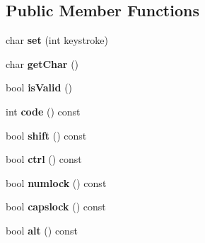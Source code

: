 \subsection*{Public Member Functions}
\begin{DoxyCompactItemize}
\item 
\hypertarget{classskl_1_1_key_input_a433d183979067662820d7b929e249b95}{}\label{classskl_1_1_key_input_a433d183979067662820d7b929e249b95} 
char {\bfseries set} (int keystroke)
\item 
\hypertarget{classskl_1_1_key_input_a9590de3ef1f3b34e1371090fc02d3b80}{}\label{classskl_1_1_key_input_a9590de3ef1f3b34e1371090fc02d3b80} 
char {\bfseries get\+Char} ()
\item 
\hypertarget{classskl_1_1_key_input_a8e3f6b5a26823d68b42bd3373376d712}{}\label{classskl_1_1_key_input_a8e3f6b5a26823d68b42bd3373376d712} 
bool {\bfseries is\+Valid} ()
\item 
\hypertarget{classskl_1_1_key_input_a5d705978e5e08298d21ccc5efe574f03}{}\label{classskl_1_1_key_input_a5d705978e5e08298d21ccc5efe574f03} 
int {\bfseries code} () const
\item 
\hypertarget{classskl_1_1_key_input_adcad47367d0a140fa7d56ada00fbce9a}{}\label{classskl_1_1_key_input_adcad47367d0a140fa7d56ada00fbce9a} 
bool {\bfseries shift} () const
\item 
\hypertarget{classskl_1_1_key_input_ad62de27cadf145a1a3321c0dbcfa2f81}{}\label{classskl_1_1_key_input_ad62de27cadf145a1a3321c0dbcfa2f81} 
bool {\bfseries ctrl} () const
\item 
\hypertarget{classskl_1_1_key_input_a9561162d5ffd33754b806e3d2bf9b8b2}{}\label{classskl_1_1_key_input_a9561162d5ffd33754b806e3d2bf9b8b2} 
bool {\bfseries numlock} () const
\item 
\hypertarget{classskl_1_1_key_input_adb125489e60f7eaa0d32c048a0544841}{}\label{classskl_1_1_key_input_adb125489e60f7eaa0d32c048a0544841} 
bool {\bfseries capslock} () const
\item 
\hypertarget{classskl_1_1_key_input_aa8928da3627ae3556198e7e2e3a5af10}{}\label{classskl_1_1_key_input_aa8928da3627ae3556198e7e2e3a5af10} 
bool {\bfseries alt} () const
\end{DoxyCompactItemize}
